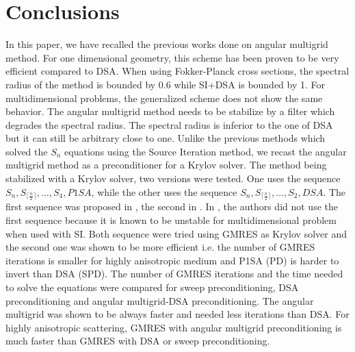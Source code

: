 \section{Conclusions}
In this paper, we have recalled the previous works done on angular multigrid
method. For one dimensional geometry, this scheme has been proven to be very 
efficient compared to DSA. When using Fokker-Planck cross sections, the
spectral radius of the method is bounded by 0.6 while SI+DSA is bounded by 1. 
For multidimensional problems, the generalized scheme does
not show the same behavior. The angular multigrid method needs to be stabilize
by a filter which degrades the spectral radius. The spectral radius is inferior 
to the one of DSA but it can still be arbitrary close to one. 
Unlike the previous methods which solved the $S_n$ equations using the Source 
Iteration method, we recast the angular multigrid method as a preconditioner 
for a Krylov solver. The method being stabilized with a Krylov solver, two 
versions were tested. One uses the sequence $S_n,S_{\lceil\frac{n}{2}\rceil},
\hdots,S_4,P1SA$, while the other uses the sequence $S_n,
S_{\lceil\frac{n}{2}\rceil},\hdots,S_2,DSA$.
The first sequence was proposed in \cite{multigrid_1d}, the second in 
\cite{multigrid_2d}. In \cite{multigrid_2d}, the authors did not use the first
sequence because it is known to be unstable for multidimensional problem when 
used with SI. Both sequence were tried using GMRES as Krylov solver and the 
second one was shown to be more 
efficient i.e. the number of GMRES iterations is smaller for highly 
anisotropic medium and P1SA (PD) is harder to invert than
DSA (SPD). The number of GMRES iterations and the time needed
to solve the equations were compared for sweep preconditioning, DSA
preconditioning and angular multigrid-DSA preconditioning. The angular
multigrid was shown to be always faster and needed less iterations than DSA.
For highly anisotropic scattering, GMRES with angular multigrid
preconditioning is much faster than GMRES with DSA or sweep preconditioning.
